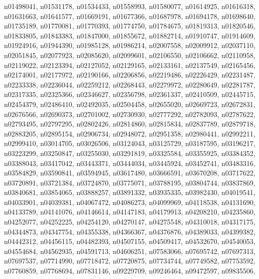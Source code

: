 \documentclass[10pt,twocolumn,letterpaper]{article}
\begin{document}
\noindent n01498041, \quad n01531178, \quad n01534433, \quad n01558993, \quad n01580077, \quad n01614925, \quad n01616318, \quad n01631663, \quad n01641577, \quad n01669191, \quad n01677366, \quad n01687978, \quad n01694178, \quad n01698640, \quad n01735189, \quad n01770081, \quad n01770393, \quad n01774750, \quad n01784675, \quad n01819313, \quad n01820546, \quad n01833805, \quad n01843383, \quad n01847000, \quad n01855672, \quad n01882714, \quad n01910747, \quad n01914609, \quad n01924916, \quad n01944390, \quad n01985128, \quad n01986214, \quad n02007558, \quad n02009912, \quad n02037110, \quad n02051845, \quad n02077923, \quad n02085620, \quad n02099601, \quad n02106550, \quad n02106662, \quad n02110958, \quad n02119022, \quad n02123394, \quad n02127052, \quad n02129165, \quad n02133161, \quad n02137549, \quad n02165456, \quad n02174001, \quad n02177972, \quad n02190166, \quad n02206856, \quad n02219486, \quad n02226429, \quad n02231487, \quad n02233338, \quad n02236044, \quad n02259212, \quad n02268443, \quad n02279972, \quad n02280649, \quad n02281787, \quad n02317335, \quad n02325366, \quad n02346627, \quad n02356798, \quad n02361337, \quad n02410509, \quad n02445715, \quad n02454379, \quad n02486410, \quad n02492035, \quad n02504458, \quad n02655020, \quad n02669723, \quad n02672831, \quad n02676566, \quad n02690373, \quad n02701002, \quad n02730930, \quad n02777292, \quad n02782093, \quad n02787622, \quad n02793495, \quad n02797295, \quad n02802426, \quad n02814860, \quad n02815834, \quad n02837789, \quad n02879718, \quad n02883205, \quad n02895154, \quad n02906734, \quad n02948072, \quad n02951358, \quad n02980441, \quad n02992211, \quad n02999410, \quad n03014705, \quad n03026506, \quad n03124043, \quad n03125729, \quad n03187595, \quad n03196217, \quad n03223299, \quad n03250847, \quad n03255030, \quad n03291819, \quad n03325584, \quad n03355925, \quad n03384352, \quad n03388043, \quad n03417042, \quad n03443371, \quad n03444034, \quad n03445924, \quad n03452741, \quad n03483316, \quad n03584829, \quad n03590841, \quad n03594945, \quad n03617480, \quad n03666591, \quad n03670208, \quad n03717622, \quad n03720891, \quad n03721384, \quad n03724870, \quad n03775071, \quad n03788195, \quad n03804744, \quad n03837869, \quad n03840681, \quad n03854065, \quad n03888257, \quad n03891332, \quad n03935335, \quad n03982430, \quad n04019541, \quad n04033901, \quad n04039381, \quad n04067472, \quad n04086273, \quad n04099969, \quad n04118538, \quad n04131690, \quad n04133789, \quad n04141076, \quad n04146614, \quad n04147183, \quad n04179913, \quad n04208210, \quad n04235860, \quad n04252077, \quad n04252225, \quad n04254120, \quad n04270147, \quad n04275548, \quad n04310018, \quad n04317175, \quad n04344873, \quad n04347754, \quad n04355338, \quad n04366367, \quad n04376876, \quad n04389033, \quad n04399382, \quad n04442312, \quad n04456115, \quad n04482393, \quad n04507155, \quad n04509417, \quad n04532670, \quad n04540053, \quad n04554684, \quad n04562935, \quad n04591713, \quad n04606251, \quad n07583066, \quad n07695742, \quad n07697313, \quad n07697537, \quad n07714990, \quad n07718472, \quad n07720875, \quad n07734744, \quad n07749582, \quad n07753592, \quad n07760859, \quad n07768694, \quad n07831146, \quad n09229709, \quad n09246464, \quad n09472597, \quad n09835506, 
\end{document}
